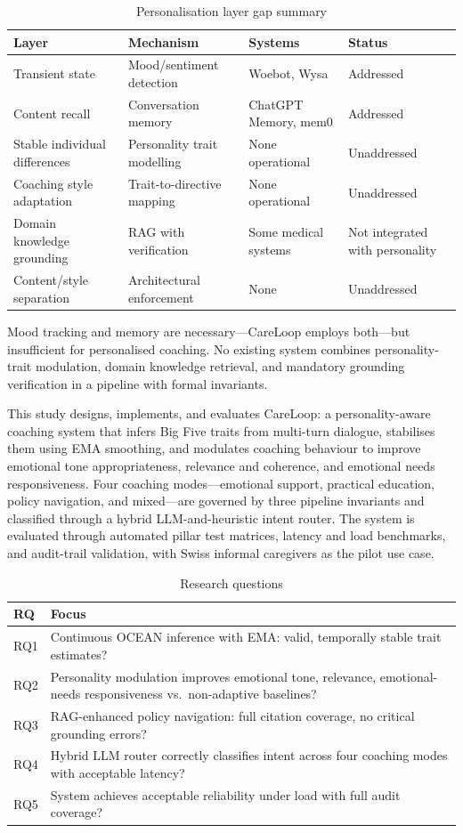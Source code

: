 \documentclass[10pt,a4paper]{report}
\begin{document}
\begin{table}[H]
\centering\small
\caption{Personalisation layer gap summary}
\begin{tabularx}{\textwidth}{@{}lXlX@{}}
\toprule
Layer & Mechanism & Systems & Status \\
\midrule
Transient state & Mood/sentiment detection & Woebot, Wysa & Addressed \\
Content recall & Conversation memory & ChatGPT Memory, mem0 & Addressed \\
Stable individual differences & Personality trait modelling & None operational & Unaddressed \\
Coaching style adaptation & Trait-to-directive mapping & None operational & Unaddressed \\
Domain knowledge grounding & RAG with verification & Some medical systems & Not integrated with personality \\
Content/style separation & Architectural enforcement & None & Unaddressed \\
\bottomrule
\end{tabularx}
\end{table}

Mood tracking and memory are necessary---CareLoop employs both---but insufficient for personalised coaching. No existing system combines personality-trait modulation, domain knowledge retrieval, and mandatory grounding verification in a pipeline with formal invariants.

This study designs, implements, and evaluates CareLoop: a personality-aware coaching system that infers Big Five traits from multi-turn dialogue, stabilises them using EMA smoothing, and modulates coaching behaviour to improve emotional tone appropriateness, relevance and coherence, and emotional needs responsiveness. Four coaching modes---emotional support, practical education, policy navigation, and mixed---are governed by three pipeline invariants and classified through a hybrid LLM-and-heuristic intent router. The system is evaluated through automated pillar test matrices, latency and load benchmarks, and audit-trail validation, with Swiss informal caregivers as the pilot use case.

\begin{table}[H]
\centering\small
\caption{Research questions}
\begin{tabularx}{\textwidth}{@{}lX@{}}
\toprule
RQ & Focus \\
\midrule
RQ1 & Continuous OCEAN inference with EMA: valid, temporally stable trait estimates? \\
RQ2 & Personality modulation improves emotional tone, relevance, emotional-needs responsiveness vs.\ non-adaptive baselines? \\
RQ3 & RAG-enhanced policy navigation: full citation coverage, no critical grounding errors? \\
RQ4 & Hybrid LLM router correctly classifies intent across four coaching modes with acceptable latency? \\
RQ5 & System achieves acceptable reliability under load with full audit coverage? \\
\bottomrule
\end{tabularx}
\end{table}
\end{document}
